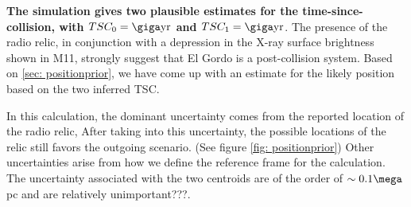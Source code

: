 \textbf{The simulation gives two plausible estimates for
the time-since-collision, with $TSC_0 = \giga \text{yr}$ and $TSC_1 = \giga
\text{yr}$}. The presence of the radio relic, in conjunction with a
depression in the X-ray surface brightness shown in M11, strongly suggest
that El Gordo is a post-collision system. 
Based on \ref{sec: positionprior}, we have come up with an estimate for the
likely position based on the two inferred TSC. 

In this calculation, the dominant uncertainty comes from the
reported location of the radio relic, 
After taking into this uncertainty, the possible locations of the relic still favors the
outgoing scenario. (See figure \ref{fig: positionprior}) Other
uncertainties arise from how we define the reference frame for the calculation. The
uncertainty associated with the two centroids are of the order
of $\sim 0.1 \mega$pc \citep{Jee13} and are relatively unimportant???.  




